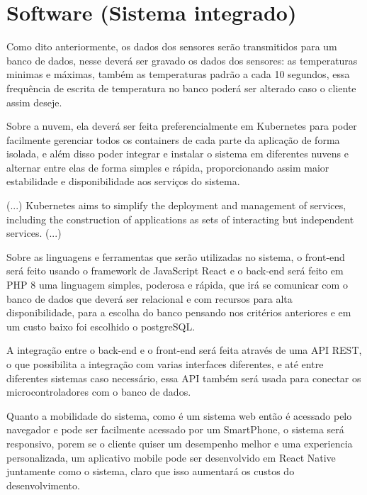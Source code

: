 \documentclass[hidelinks, 12pt, a4paper, brazil, oneside]{abntex2}
\begin{document}
\section{Software (Sistema integrado)}

    Como dito anteriormente, os dados 
    dos sensores serão transmitidos para um banco de dados,
    nesse deverá ser gravado os dados dos sensores:
    as temperaturas minimas e máximas, também as temperaturas 
    padrão a cada 10 segundos, essa frequência de 
    escrita de temperatura no banco poderá ser alterado caso o 
    cliente assim deseje.

    Sobre a nuvem, ela deverá ser feita preferencialmente 
    em Kubernetes para poder facilmente gerenciar todos os containers 
    de cada parte da aplicação de forma isolada, e além disso 
    poder integrar e instalar o sistema em diferentes nuvens
    e alternar entre elas de forma simples e rápida, 
    proporcionando assim maior estabilidade e disponibilidade
    aos serviços do sistema.

    \begin{citacao}[english]
        (...)
        Kubernetes aims to simplify the deployment and management 
        of services, including the construction of applications 
        as sets of interacting but independent services.
        (...)
        \cite{brewer2015kubernetes}
    \end{citacao}

    Sobre as linguagens e ferramentas que serão utilizadas
    no sistema, o front-end será feito usando o framework 
    de JavaScript React e o back-end será feito em PHP 8
    uma linguagem simples, poderosa e rápida, que irá se comunicar
    com o banco de dados que deverá ser relacional e com recursos
    para alta disponibilidade, para a escolha do banco pensando nos
    critérios anteriores e em um custo baixo foi escolhido o 
    postgreSQL.

    A integração entre o back-end e o front-end será feita 
    através de uma API REST, o que possibilita a integração 
    com varias interfaces diferentes, e até entre diferentes
    sistemas caso necessário, essa API também será usada 
    para conectar os microcontroladores com o banco de dados.

    Quanto a mobilidade do sistema, como é um sistema web
    então é acessado pelo navegador e pode ser facilmente
    acessado por um SmartPhone, o sistema será responsivo, 
    porem se o cliente quiser um desempenho melhor e 
    uma experiencia personalizada, um aplicativo 
    mobile pode ser desenvolvido em React Native 
    juntamente como o sistema, claro que isso aumentará 
    os custos do desenvolvimento.
\end{document}
